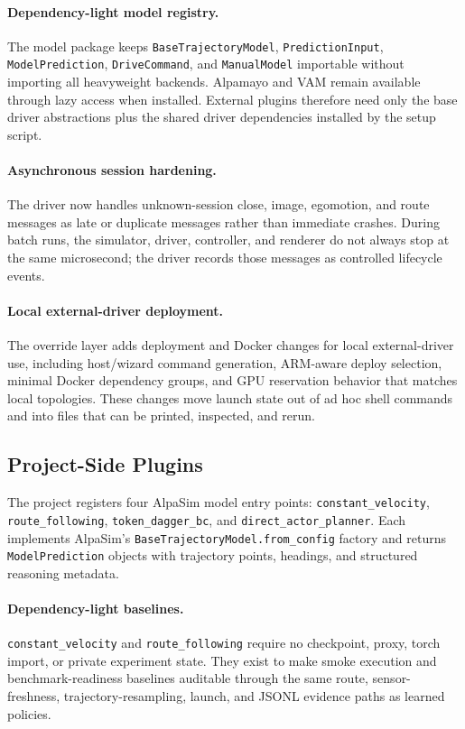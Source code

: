 \documentclass{article}
\begin{document}
\paragraph{Dependency-light model registry.}
The model package keeps \texttt{BaseTrajectoryModel}, \texttt{PredictionInput},
\texttt{ModelPrediction}, \texttt{DriveCommand}, and \texttt{ManualModel} importable
without importing all heavyweight backends. Alpamayo and VAM remain available through
lazy access when installed. External plugins therefore need only the base driver
abstractions plus the shared driver dependencies installed by the setup script.

\paragraph{Asynchronous session hardening.}
The driver now handles unknown-session close, image, egomotion, and route messages as
late or duplicate messages rather than immediate crashes. During batch runs, the
simulator, driver, controller, and renderer do not always stop at the same microsecond;
the driver records those messages as controlled lifecycle events.

\paragraph{Local external-driver deployment.}
The override layer adds deployment and Docker changes for local external-driver use,
including host/wizard command generation, ARM-aware deploy selection, minimal Docker
dependency groups, and GPU reservation behavior that matches local topologies. These
changes move launch state out of ad hoc shell commands and into files that can be
printed, inspected, and rerun.

\subsection{Project-Side Plugins}

The project registers four AlpaSim model entry points:
\texttt{constant\_velocity}, \texttt{route\_following}, \texttt{token\_dagger\_bc},
and \texttt{direct\_actor\_planner}. Each implements AlpaSim's
\texttt{BaseTrajectoryModel.from\_config} factory and returns
\texttt{ModelPrediction} objects with trajectory points, headings, and structured
reasoning metadata.

\paragraph{Dependency-light baselines.}
\texttt{constant\_velocity} and \texttt{route\_following} require no checkpoint,
proxy, torch import, or private experiment state. They exist to make smoke execution
and benchmark-readiness baselines auditable through the same route, sensor-freshness,
trajectory-resampling, launch, and JSONL evidence paths as learned policies.
\end{document}
